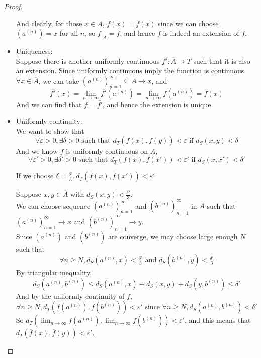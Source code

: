 \begin{proof}
\begin{itemize}
        And clearly, for those $x \in A$, $\overline{f}(x) = f(x)$ since we can choose $(a^{(n)}) = x$ for all $n$, so $\overline{f}|_A = f$, and hence $\overline{f}$ is indeed an extension of $f$.

        \item Uniqueness: \\
        Suppose there is another uniformly continuous $\overline{f'} : \overline{A} \to T$ such that it is also an extension. Since uniformly continuous imply the function is continuous. $\forall x \in \overline{A}$, we can take $(a^{(n)})_{n=1}^\infty \subseteq A \to x$, and 
        \[
        \overline{f'}(x) = \lim_{n \to \infty} \overline{f'}(a^{(n)}) = \lim_{n \to \infty} f(a^{(n)}) = \overline{f}(x)
        \]
        And we can find that $\overline{f} = \overline{f'}$, and hence the extension is unique.

        \item Uniformly continuity: \\
        We want to show that
        \[
        \forall \varepsilon > 0, \exists \delta > 0 \text{ such that } d_T(\overline{f}(x), \overline{f}(y)) < \varepsilon \text{ if } d_S(x, y) < \delta 
        \]
        And we know $f$ is uniformly continuous on $A$,
        \[
        \forall \varepsilon' > 0, \exists \delta' > 0 \text{ such that } d_T({f}(x), {f}(x')) < \varepsilon' \text{ if } d_S(x, x') < \delta' 
        \]
        \begin{claim}
            If we choose $\delta = \tfrac{\delta'}{3}, d_T(\overline{f}(x), \overline{f}(x')) < \varepsilon'$
        \end{claim}
        \begin{explanation}
            Suppose $x, y \in \overline{A}$ with $d_S(x,y) < \tfrac{\delta'}{3}$. \\
            We can choose sequence $(a^{(n)})_{n=1}^\infty$ and $(b^{(n)})_{n=1}^\infty$ in $A$ such that $(a^{(n)})_{n=1}^\infty \to x$ and $(b^{(n)})_{n=1}^\infty \to y$. \\
            Since $(a^{(n)})$ and $(b^{(n)})$ are converge, we may choose large enough $N$ such that
            \[
                \forall n \ge N, d_S(a^{(n)}, x) < \tfrac{\delta'}{3} \text{ and } d_S(b^{(n)}, y) < \tfrac{\delta'}{3}
            \]
            By triangular inequality,
            \[
                d_S(a^{(n)}, b^{(n)}) \le d_S(a^{(n)},x) + d_S(x,y) + d_S(y,b^{(n)}) \le \delta'
            \]
            And by the uniformly continuity of $f$,
            \[
            \forall n \ge N, d_T(f(a^{(n)}), f(b^{(n)})) < \varepsilon' \text{ since } \forall n \ge N, d_S(a^{(n)}, b^{(n)}) < \delta'
            \]
            So $d_T(\lim_{n \to \infty}f(a^{(n)}), \lim_{n \to \infty}f(b^{(n)})) < \varepsilon'$, and this means that $d_T(\overline{f}(x), \overline{f}(y)) < \varepsilon'$.
        \end{explanation}


\end{itemize}
\end{proof}
